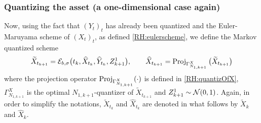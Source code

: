 \subsubsection{Quantizing the asset (a one-dimensional case again)}

Now, using the fact that $(Y_t)_{t}$ has already been quantized and the Euler-Maruyama scheme of $(X_t)_{t}$, as defined \eqref{RH:eulerscheme}, we define the Markov quantized scheme
\begin{equation}\label{RH:recurQuantiAsset}
	\widetilde{X}_{t_{k+1}} = \mathcal{E}_{b, \sigma} \big( t_k, \widehat X_{t_k}, \widehat Y_{t_k}, Z_{k+1}^1 \big), \qquad \widehat X_{t_{k+1}} = \operatorname{\mathrm{Proj}}_{\Gamma_{N_{1,k+1}}^X} \big( \widetilde{X}_{t_{k+1}} \big)
\end{equation}
where the projection operator $\operatorname{\mathrm{Proj}}_{\Gamma_{N_{1,k+1}}^X}(\cdot)$ is defined in \eqref{RH:quantizOfX}, $\Gamma_{N_{1,k+1}}^X$ is the optimal $N_{1,k+1}$-quantizer of $\widetilde{X}_{t_{k+1}}$ and $Z_{k+1}^1 \sim \operatorname{\mathcal{N}}(0,1)$. Again, in order to simplify the notations, $\widetilde X_{t_{k}}$ and $\widehat X_{t_k}$ are denoted in what follows by $\widetilde X_k$ and $\widehat X_k$.

